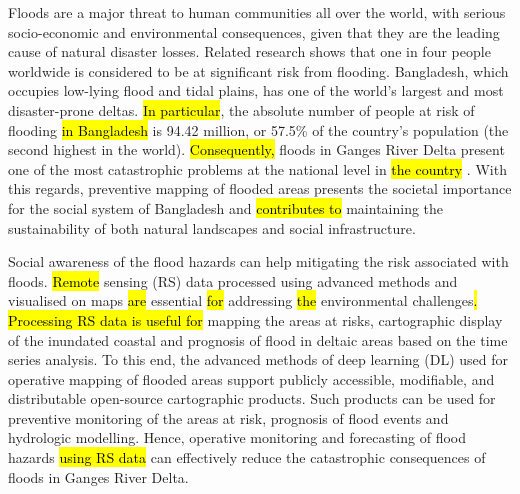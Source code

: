 \documentclass[water,article,submit,pdftex,moreauthors]{Definitions/mdpi}
\begin{document}
Floods are a major threat to human communities all over the world, with serious socio-economic and environmental consequences, given that they are the leading cause of natural disaster losses. Related research shows that one in four people worldwide is considered to be at significant risk from flooding. Bangladesh, which occupies low-lying flood and tidal plains, has one of the world's largest and most disaster-prone deltas. \hl{In particular}, the absolute number of people at risk of flooding \hl{in Bangladesh} is 94.42 million, or 57.5\% of the country's population (the second highest in the world). \hl{Consequently, }floods in Ganges River Delta present one of the most catastrophic problems at the national level in \hl{the country} \cite{Szabo}. With this regards, preventive mapping of flooded areas presents the societal importance for the social system of Bangladesh and \hl{contributes to }maintaining the sustainability of both natural landscapes and social infrastructure. 

Social awareness of the flood hazards can help mitigating the risk associated with floods. \hl{Remote} sensing (RS) data processed using advanced methods and visualised on maps \hl{are} essential \hl{for} addressing \hl{the} environmental challenges\hl{. Processing RS data is useful for} mapping the areas at risks, cartographic display of the inundated coastal and prognosis of flood in deltaic areas based on the time series analysis. To this end, the advanced methods of deep learning (DL) used for operative mapping of flooded areas support publicly accessible, modifiable, and distributable open-source cartographic products. Such products can be used for preventive monitoring of the areas at risk, prognosis of flood events and hydrologic modelling. Hence, operative monitoring and forecasting of flood hazards \hl{using RS data }can effectively reduce the catastrophic consequences of floods in Ganges River Delta. 
\end{document}
